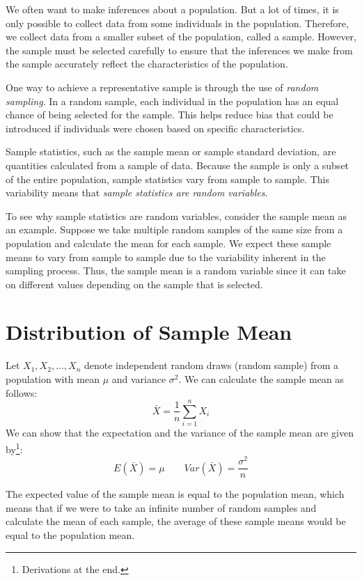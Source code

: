 \documentclass{./../../Latex/handout}
\begin{document}
\thispagestyle{plain}


We often want to make inferences about a population. But a lot of times, it is only possible to collect data from some individuals in the population. Therefore, we collect data from a smaller subset of the population, called a sample. However, the sample must be selected carefully to ensure that the inferences we make from the sample accurately reflect the characteristics of the population.

One way to achieve a representative sample is through the use of \textit{random sampling}. In a random sample, each individual in the population has an equal chance of being selected for the sample. This helps reduce bias that could be introduced if individuals were chosen based on specific characteristics.

Sample statistics, such as the sample mean or sample standard deviation, are quantities calculated from a sample of data. Because the sample is only a subset of the entire population, sample statistics vary from sample to sample. This variability means that \textit{sample statistics are random variables}.

To see why sample statistics are random variables, consider the sample mean as an example. Suppose we take multiple random samples of the same size from a population and calculate the mean for each sample. We expect these sample means to vary from sample to sample due to the variability inherent in the sampling process. Thus, the sample mean is a random variable since it can take on different values depending on the sample that is selected.

\vspace{-1em}
\section{Distribution of Sample Mean}
\vspace{-1em}

Let $X_1,X_2,...,X_n$ denote independent random draws (random sample) from a population with mean $\mu$ and variance $\sigma^2$. We can calculate the sample mean as follows:
$$ \bar{X} = \frac{1}{n} \sum_{i=1}^n X_i $$
We can show that the expectation and the variance of the sample mean are given by\footnote{Derivations at the end.}:
$$E(\bar{X}) = \mu \quad \quad Var(\bar{X}) = \frac{\sigma^2}{n} $$ 

The expected value of the sample mean is equal to the population mean, which means that if we were to take an infinite number of random samples and calculate the mean of each sample, the average of these sample means would be equal to the population mean.
\end{document}
